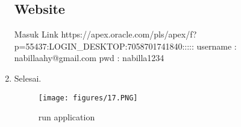 \begin{enumerate}
\subsection{Website} 
\par Masuk Link https://apex.oracle.com/pls/apex/f?p=55437:LOGIN_DESKTOP:7058701741840:::::
username : nabillaahy@gmail.com
pwd : nabilla1234

\item Selesai.
\begin{figure}[!htbp]
\centering
\texttt{[image: figures/17.PNG]}
\caption{run application}
\label{penanda}
\end{figure}
\end{enumerate}